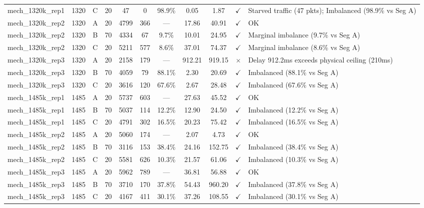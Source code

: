 \begin{longtable}{lcccccccccp{4.2cm}}
mech\_1320k\_rep1 & 1320 & C & 20 & 47 & 0 & 98.9\% & 0.05 & 1.87 & $\checkmark$ & Starved traffic (47 pkts); Imbalanced (98.9\% vs Seg A) \\
mech\_1320k\_rep2 & 1320 & A & 20 & 4799 & 366 & --- & 17.86 & 40.91 & $\checkmark$ & OK \\
mech\_1320k\_rep2 & 1320 & B & 70 & 4334 & 67 & 9.7\% & 10.01 & 24.95 & $\checkmark$ & Marginal imbalance (9.7\% vs Seg A) \\
mech\_1320k\_rep2 & 1320 & C & 20 & 5211 & 577 & 8.6\% & 37.01 & 74.37 & $\checkmark$ & Marginal imbalance (8.6\% vs Seg A) \\
mech\_1320k\_rep3 & 1320 & A & 20 & 2158 & 179 & --- & 912.21 & 919.15 & $\times$ & Delay 912.2ms exceeds physical ceiling (210ms) \\
mech\_1320k\_rep3 & 1320 & B & 70 & 4059 & 79 & 88.1\% & 2.30 & 20.69 & $\checkmark$ & Imbalanced (88.1\% vs Seg A) \\
mech\_1320k\_rep3 & 1320 & C & 20 & 3616 & 120 & 67.6\% & 2.67 & 28.48 & $\checkmark$ & Imbalanced (67.6\% vs Seg A) \\
mech\_1485k\_rep1 & 1485 & A & 20 & 5737 & 603 & --- & 27.63 & 45.52 & $\checkmark$ & OK \\
mech\_1485k\_rep1 & 1485 & B & 70 & 5037 & 114 & 12.2\% & 12.90 & 24.50 & $\checkmark$ & Imbalanced (12.2\% vs Seg A) \\
mech\_1485k\_rep1 & 1485 & C & 20 & 4791 & 302 & 16.5\% & 20.23 & 75.42 & $\checkmark$ & Imbalanced (16.5\% vs Seg A) \\
mech\_1485k\_rep2 & 1485 & A & 20 & 5060 & 174 & --- & 2.07 & 4.73 & $\checkmark$ & OK \\
mech\_1485k\_rep2 & 1485 & B & 70 & 3116 & 153 & 38.4\% & 24.16 & 152.75 & $\checkmark$ & Imbalanced (38.4\% vs Seg A) \\
mech\_1485k\_rep2 & 1485 & C & 20 & 5581 & 626 & 10.3\% & 21.57 & 61.06 & $\checkmark$ & Imbalanced (10.3\% vs Seg A) \\
mech\_1485k\_rep3 & 1485 & A & 20 & 5962 & 789 & --- & 36.81 & 56.88 & $\checkmark$ & OK \\
mech\_1485k\_rep3 & 1485 & B & 70 & 3710 & 170 & 37.8\% & 54.43 & 960.20 & $\checkmark$ & Imbalanced (37.8\% vs Seg A) \\
mech\_1485k\_rep3 & 1485 & C & 20 & 4167 & 411 & 30.1\% & 37.26 & 108.55 & $\checkmark$ & Imbalanced (30.1\% vs Seg A) \\
\end{longtable}
